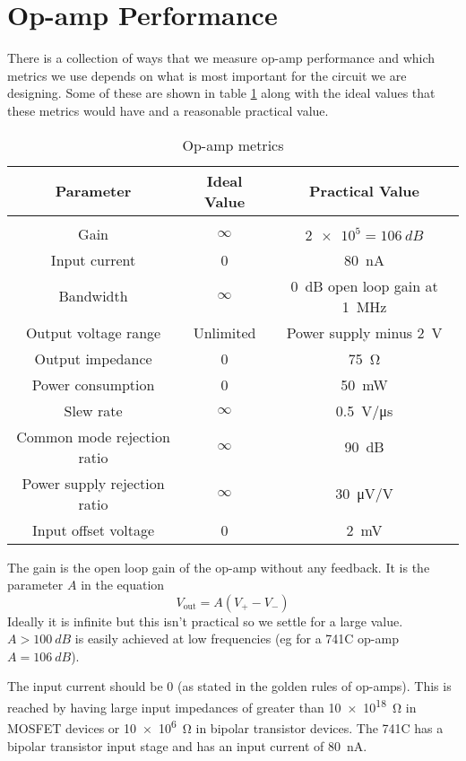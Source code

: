 \documentclass{article}
\begin{document}
    \section{Op-amp Performance}
    There is a collection of ways that we measure op-amp performance and which metrics we use depends on what is most important for the circuit we are designing.
    Some of these are shown in table \ref{tab:op-amp metrics} along with the ideal values that these metrics would have and a reasonable practical value.
    \begin{table}[ht]
        \centering
        \begin{tabular}{c|c|c}
            Parameter & Ideal Value & Practical Value\\ \hline
            &&\\[-0.3cm]
            Gain & \(\infty\) & \(\num{2e5} = \SI{106}{dB}\)\\
            Input current & 0 & \SI{80}{nA}\\
            Bandwidth & \(\infty\) & \SI{0}{dB} open loop gain at \SI{1}{MHz}\\
            Output voltage range & Unlimited & Power supply minus \SI{2}{V}\\
            Output impedance & 0 & \SI{75}{\ohm}\\
            Power consumption & 0 & \SI{50}{mW}\\
            Slew rate & \(\infty\) & \SI{0.5}{V/\micro s}\\
            Common mode rejection ratio & \(\infty\) & \SI{90}{dB}\\
            Power supply rejection ratio & \(\infty\) & \SI{30}{\micro V/V}\\
            Input offset voltage & 0 & \SI{2}{mV}
        \end{tabular}
        \caption{Op-amp metrics}
        \label{tab:op-amp metrics}
    \end{table}
    The gain is the open loop gain of the op-amp without any feedback.
    It is the parameter \(A\) in the equation
    \[V_\text{out} = A(V_+-V_-)\]
    Ideally it is infinite but this isn't practical so we settle for a large value.
    \(A > \SI{100}{dB}\) is easily achieved at low frequencies (eg for a 741C op-amp \(A = \SI{106}{dB}\)).
    
    The input current should be 0 (as stated in the golden rules of op-amps).
    This is reached by having large input impedances of greater than \SI{10e18}{\ohm} in MOSFET devices or \SI{10e6}{\ohm} in bipolar transistor devices.
    The 741C has a bipolar transistor input stage and has an input current of \SI{80}{nA}.
    
\end{document}
